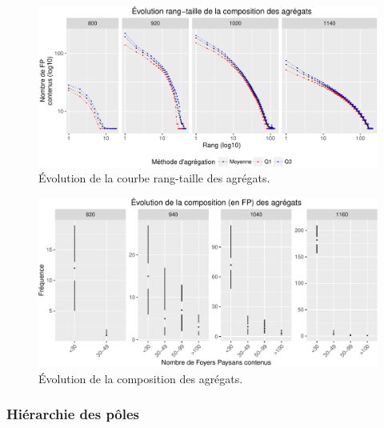 \begin{figure}[H]
\captionsetup{width=\linewidth}
\includegraphics[width=.8\linewidth]{img/resultats/v0_rt_agregats.pdf}
\caption{Évolution de la courbe rang-taille des agrégats.} 
\label{fig:rt-agregats-v0} 
\end{figure}

\begin{figure}[H]
\captionsetup{width=\linewidth}
\includegraphics[width=.8\linewidth]{img/resultats/v0_compo_agregats.pdf}
\caption{Évolution de la composition des agrégats.} 
\label{fig:compo-agregats-v0} 
\end{figure}

\clearpage

\subsubsection{Hiérarchie des pôles}

